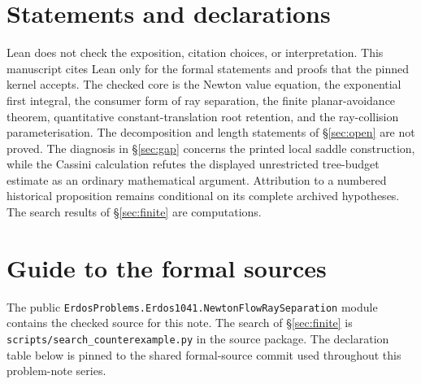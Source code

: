 \section*{Statements and declarations}

Lean does not check the exposition, citation choices, or interpretation. This
manuscript cites Lean only for the formal statements and proofs that the pinned
kernel accepts. The checked
core is the Newton value equation, the exponential first integral, the consumer
form of ray separation, the finite planar-avoidance theorem, quantitative
constant-translation root retention, and the ray-collision parameterisation.  The
decomposition and length statements of \S\ref{sec:open} are not proved.  The
diagnosis in \S\ref{sec:gap} concerns the printed local saddle construction,
while the Cassini calculation refutes the displayed unrestricted tree-budget
estimate as an ordinary mathematical argument.  Attribution to a numbered
historical proposition remains conditional on its complete archived
hypotheses.  The
search results of \S\ref{sec:finite} are computations.

\appendix
\section{Guide to the formal sources}\label{app:sources}

The public \texttt{ErdosProblems.Erdos1041.NewtonFlowRaySeparation} module
contains the checked source for this note.  The search of \S\ref{sec:finite} is
\texttt{scripts/search\_counterexample.py} in the source package.  The
declaration table below is pinned to the shared formal-source commit used
throughout this problem-note series.

